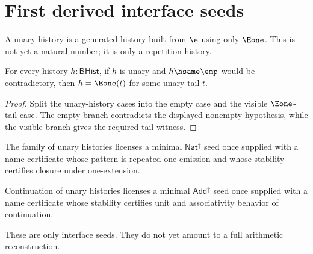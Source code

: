 \section{First derived interface seeds}

\begin{definition}
\label{def:unary-history}
A unary history is a generated history built from \(\e\) using only \(\Eone\).  This is not yet a natural number; it is only a repetition history.
\end{definition}

\begin{theorem}
\label{thm:unary-history-nonempty-e1-tail}
For every history \(h:\mathsf{BHist}\), if \(h\) is unary and \(h\hsame\emp\)
would be contradictory, then \(h=\Eone(t)\) for some unary tail \(t\).
\end{theorem}
\begin{proof}
Split the unary-history cases into the empty case and the visible
\(\Eone\)-tail case. The empty branch contradicts the displayed nonempty
hypothesis, while the visible branch gives the required tail witness.
\end{proof}

\begin{corollary}
The family of unary histories licenses a minimal \(\mathsf{Nat}^{\uparrow}\) seed once supplied with a name certificate whose pattern is repeated one-emission and whose stability certifies closure under one-extension.
\end{corollary}

\begin{corollary}
Continuation of unary histories licenses a minimal \(\mathsf{Add}^{\uparrow}\) seed once supplied with a name certificate whose stability certifies unit and associativity behavior of continuation.
\end{corollary}

\begin{remark}
These are only interface seeds.  They do not yet amount to a full arithmetic reconstruction.
\end{remark}
